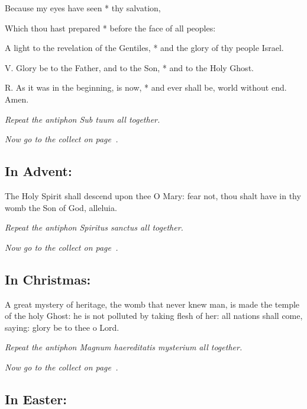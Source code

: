 \documentclass[12pt,a5paper]{memoir}
\newcommand{\rubrics}[1]{\noindent\textit{#1}}
\begin{document}
Because my eyes have seen * thy salvation,

Which thou hast prepared * before the face of all peoples:

A light to the revelation of the Gentiles, * and the glory of thy people Israel.

V. Glory be to the Father, and to the Son, * and to the Holy Ghost.

R. As it was in the beginning, is now, * and ever shall be, world without end. Amen.


\rubrics{Repeat the antiphon \emph{Sub tuum} all together.}

\rubrics{Now go to the collect on page~\pageref{collect}.}

\subsection*{In Advent:}


The Holy Spirit shall descend upon thee O Mary: fear not, thou shalt have in thy womb the Son of God, alleluia.


\rubrics{Repeat the antiphon \emph{Spiritus sanctus} all together.}

\rubrics{Now go to the collect on page~\pageref{collect}.}


\subsection*{In Christmas:}


A great mystery of heritage, the womb that never knew man, is made the temple of the holy Ghost: he is not polluted by taking flesh of her: all nations shall come, saying: glory be to thee o Lord.


\rubrics{Repeat the antiphon \emph{Magnum haereditatis mysterium} all together.}

\rubrics{Now go to the collect on page~\pageref{collect}.}



\subsection*{In Easter:}
\end{document}
